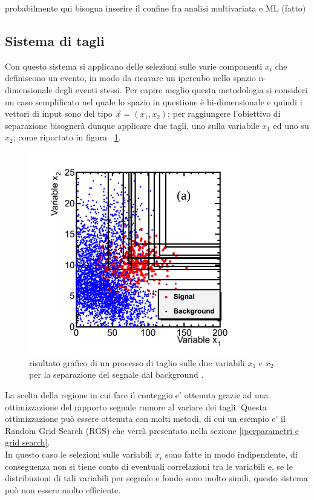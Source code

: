 \color{red}
probabilmente qui bisogna inserire il confine fra analisi multivariata e ML (fatto)
\color{black}


\newpage
\subsection{Sistema di tagli}
\label{sistema di tagli}
Con questo sistema si applicano delle selezioni sulle varie componenti $x_i$ che definiscono un evento, in modo da ricavare un ipercubo nello spazio n-dimensionale degli eventi stessi. Per capire meglio questa metodologia si consideri un caso semplificato nel quale lo spazio in questione è bi-dimensionale e quindi i vettori di input sono del tipo $\vec{x} = (x_1,x_2)$; per raggiungere l'obiettivo di separazione bisognerà dunque applicare due tagli, uno sulla variabile $x_1$ ed uno su $x_2$, come riportato in figura ~\ref{fig:grid_example}.

\begin{figure}[h!]
	\centering
	\includegraphics[width=0.85\textwidth]{figs/Grid_example.png}
	\caption{risultato grafico di un processo di taglio sulle due variabili $x_1$ e $x_2$ per la separazione del segnale dal background \cite{Metodi_multivariati}.}
	\label{fig:grid_example}
\end{figure}

La scelta della regione in cui fare il conteggio e' ottenuta grazie ad una ottimizzazione del rapporto segnale rumore al variare dei tagli. Questa ottimizzazione può essere ottenuta con molti metodi, di cui un esempio e' il Random Grid Search (RGS) che verrà presentato nella sezione \ref{iperparametri e grid search}. \\
In questo caso le selezioni sulle variabili $x_i$ sono fatte in modo indipendente, di conseguenza non si tiene conto di eventuali correlazioni tra le variabili e, se le distribuzioni di tali variabili per segnale e fondo sono molto simili, questo sistema può non essere molto efficiente.

